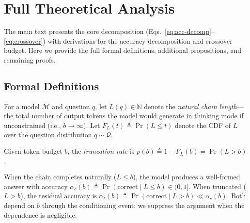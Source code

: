 


\section{Full Theoretical Analysis}
\label{app:theory-full}

The main text presents the core decomposition (Eqs.~\ref{eq:acc-decomp}--\ref{eq:crossover}) with derivations for the accuracy decomposition and crossover budget.
Here we provide the full formal definitions, additional propositions, and remaining proofs.

\subsection{Formal Definitions}

\begin{definition}
For a model $\mathcal{M}$ and question $q$, let $L(q) \in \mathbb{N}$
denote the \emph{natural chain length}---the total number of output tokens
the model would generate in thinking mode if unconstrained
(i.e., $b \to \infty$).
Let $F_L(t) \triangleq \Pr(L \le t)$ denote the CDF of $L$ over the
question distribution $q \sim \mathcal{Q}$.
\end{definition}

\begin{definition}
Given token budget $b$, the \emph{truncation rate} is
$\rho(b) \triangleq 1 - F_L(b) = \Pr(L > b)$.
\end{definition}

\begin{assumption}
\label{asm:binary-restated}
When the chain completes naturally ($L \le b$), the model produces a
well-formed answer with accuracy $\alpha_c(b) \triangleq
\Pr(\text{correct} \mid L \le b) \in (0,1]$.
When truncated ($L > b$), the residual accuracy is
$\alpha_t(b) \triangleq \Pr(\text{correct} \mid L > b) \ll \alpha_c(b)$.
Both depend on $b$ through the conditioning event; we suppress the
argument when the dependence is negligible.
\end{assumption}

